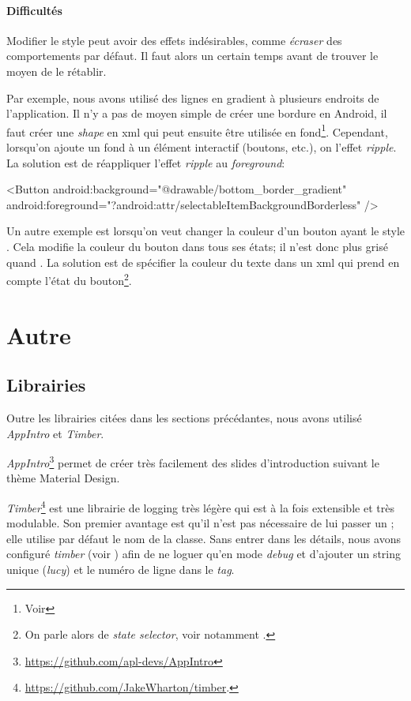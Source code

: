 \paragraph*{Difficultés} Modifier le style peut avoir des effets indésirables, comme \emph{écraser} des comportements par défaut. Il faut alors un certain temps avant de trouver le moyen de le rétablir. 

Par exemple, nous avons utilisé des lignes en gradient à plusieurs endroits de l'application. Il n'y a pas de moyen simple de créer une bordure en Android, il faut créer une \emph{shape} en xml qui peut ensuite être utilisée en fond\footnote{Voir }. Cependant, lorsqu'on ajoute un fond à un élément interactif (boutons, etc.), on  l'effet \emph{ripple}. La solution est de réappliquer l'effet \emph{ripple} au \emph{foreground}:

\begin{xmlcode}
<Button 
    android:background="@drawable/bottom_border_gradient"
    android:foreground="?android:attr/selectableItemBackgroundBorderless" />
\end{xmlcode}

Un autre exemple est lorsqu'on veut changer la couleur d'un bouton ayant le style . Cela modifie la couleur du bouton dans tous ses états; il n'est donc plus grisé quand . La solution est de spécifier la couleur du texte dans un xml qui prend en compte l'état du bouton\footnote{On parle alors de \emph{state selector}, voir notamment .}.

\section{Autre}


\subsection{Librairies}

Outre les librairies citées dans les sections précédantes, nous avons utilisé \emph{AppIntro} et \emph{Timber}.

\emph{AppIntro}\footnote{\url{https://github.com/apl-devs/AppIntro}} permet de créer très facilement des slides d'introduction suivant le thème Material Design. 

\emph{Timber}\footnote{\url{https://github.com/JakeWharton/timber}.} est une librairie de logging très légère qui est à la fois extensible et très modulable. Son premier avantage est qu'il n'est pas nécessaire de lui passer un ; elle utilise par défaut le nom de la classe. Sans entrer dans les détails, nous avons configuré \emph{timber} (voir ) afin de ne loguer qu'en mode \emph{debug} et d'ajouter un string unique (\emph{lucy}) et le numéro de ligne dans le \emph{tag}. 

